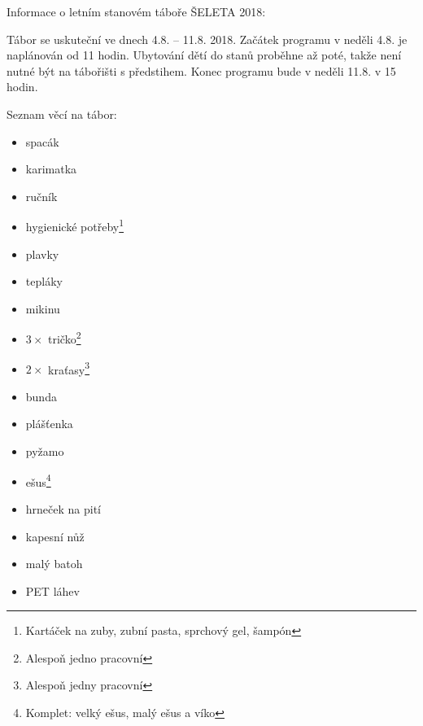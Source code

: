 \documentclass[a4paper]{article}
\begin{document}
Informace o letním stanovém táboře ŠELETA 2018:

Tábor se uskuteční ve dnech 4.8. -- 11.8. 2018. Začátek programu v neděli 4.8. je naplánován od 11 hodin. Ubytování dětí do stanů proběhne až poté, takže není nutné být na tábořišti s předstihem. Konec programu bude v neděli 11.8. v 15 hodin.

Seznam věcí na tábor:
\begin{itemize}
\item spacák
\item karimatka
\item ručník
\item hygienické potřeby\footnote{Kartáček na zuby, zubní pasta, sprchový gel, šampón}
\item plavky
\item tepláky
\item mikinu
\item $3\times$ tričko\footnote{Alespoň jedno pracovní}
\item $2\times$ kraťasy\footnote{Alespoň jedny pracovní}
\item bunda
\item plášťenka
\item pyžamo
\item ešus\footnote{Komplet: velký ešus, malý ešus a víko}
\item hrneček na pití
\item kapesní nůž
\item malý batoh
\item PET láhev
\end{itemize}
\end{document}
